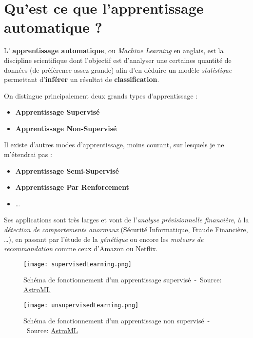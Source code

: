 \section{Qu'est ce que l'apprentissage automatique ?}

L' \textbf{apprentissage automatique}, ou \textit{Machine Learning} en anglais, est la discipline scientifique dont l'objectif est d'analyser une certaines quantité de données (de préférence assez grande) afin d'en déduire un modèle \textit{statistique} permettant d'\textbf{inférer} un résultat de \textbf{classification}.

On distingue principalement deux grands types d'apprentissage :
\begin{itemize}
	\item \textbf{Apprentissage Supervisé}
	\item \textbf{Apprentissage Non-Supervisé}
\end{itemize}
\vspace{3mm}

Il existe d'autres modes d'apprentissage, moins courant, sur lesquels je ne m'étendrai pas :
\begin{itemize}
	\item \textbf{Apprentissage Semi-Supervisé}
	\item \textbf{Apprentissage Par Renforcement}
	\item \ldots
\end{itemize}
\vspace{3mm}
 
Ses applications sont très larges et vont de l'\textit{analyse prévisionnelle financière}, à la \textit{détection de comportements anormaux} (Sécurité Informatique, Fraude Financière, \ldots), en passant par l'étude de la \textit{génétique} ou encore les \textit{moteurs de recommandation} comme ceux d'Amazon ou Netflix. 

 \begin{figure}[H]
    \centering
    \texttt{[image: supervisedLearning.png]}
	\caption{Schéma de fonctionnement d'un apprentissage supervisé~-~Source: \href{http://www.astroml.org/sklearn_tutorial/general_concepts.html\#supervised-learning-model-fit-x-y}{AstroML}}\label{image.supervisedLearning} 
\end{figure}

 \begin{figure}[H]
    \centering
    \texttt{[image: unsupervisedLearning.png]}
	\caption{Schéma de fonctionnement d'un apprentissage non supervisé~-~Source: \href{http://www.astroml.org/sklearn_tutorial/general_concepts.html\#unsupervised-learning-model-fit-x}{AstroML}}\label{image.unsupervisedLearning} 
\end{figure}


